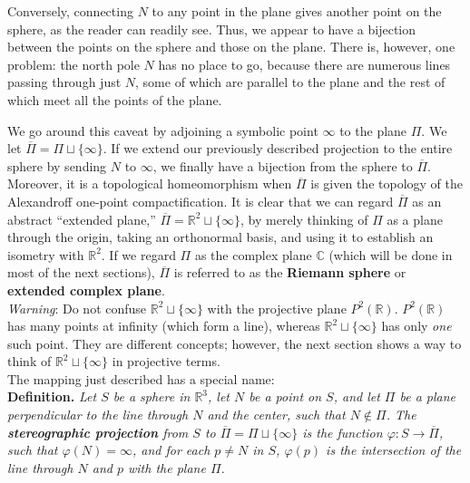 \documentclass[leqno]{book}
\begin{document}
Conversely, connecting $N$ to any point in the plane gives another point on the sphere, as the reader can readily see.  Thus, we appear to have a bijection between the points on the sphere and those on the plane.  There is, however, one problem: the north pole $N$ has no place to go, because there are numerous lines passing through just $N$, some of which are parallel to the plane and the rest of which meet all the points of the plane.

We go around this caveat by adjoining a symbolic point $\infty$ to the plane $\Pi$.  We let $\overline{\Pi}=\Pi\sqcup\{\infty\}$.  If we extend our previously described projection to the entire sphere by sending $N$ to $\infty$, we finally have a bijection from the sphere to $\overline{\Pi}$.  Moreover, it is a topological homeomorphism when $\overline{\Pi}$ is given the topology of the Alexandroff one-point compactification.  It is clear that we can regard $\overline{\Pi}$ as an abstract ``extended plane,'' $\overline{\Pi}=\mathbb R^2\sqcup\{\infty\}$, by merely thinking of $\Pi$ as a plane through the origin, taking an orthonormal basis, and using it to establish an isometry with $\mathbb R^2$.  If we regard $\Pi$ as the complex plane $\mathbb C$ (which will be done in most of the next sections), $\overline{\Pi}$ is referred to as the \textbf{Riemann sphere} or \textbf{extended complex plane}.\\

\noindent\emph{Warning}: Do not confuse $\mathbb R^2\sqcup\{\infty\}$ with the projective plane $P^2(\mathbb R)$.  $P^2(\mathbb R)$ has many points at infinity (which form a line), whereas $\mathbb R^2\sqcup\{\infty\}$ has only \emph{one} such point.  They are different concepts; however, the next section shows a way to think of $\mathbb R^2\sqcup\{\infty\}$ in projective terms.\\

\noindent The mapping just described has a special name:\\

\noindent\textbf{Definition.} \emph{Let $S$ be a sphere in $\mathbb R^3$, let $N$ be a point on $S$, and let $\Pi$ be a plane perpendicular to the line through $N$ and the center, such that $N\notin\Pi$.  The \textbf{stereographic projection} from $S$ to $\overline{\Pi}=\Pi\sqcup\{\infty\}$ is the function $\varphi:S\to\overline{\Pi}$, such that $\varphi(N)=\infty$, and for each $p\ne N$ in $S$, $\varphi(p)$ is the intersection of the line through $N$ and $p$ with the plane $\Pi$.}\\
\end{document}
